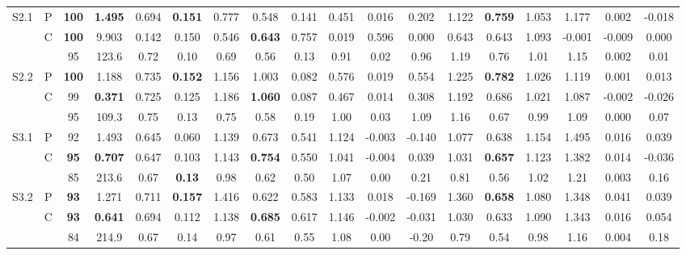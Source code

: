 \begin{table*}[t!]
\begin{adjustbox}{max width=\textwidth}
\begin{tabular}{|c|ccc|cc|cccccc|cccccc|}
\multirow{3}{*}{S2.1} & P & \textbf{100} & \textbf{1.495}  & 0.694 & \textbf{0.151} & 0.777  & 0.548 & 0.141 & 0.451 & 0.016  & 0.202  & 1.122  & \textbf{0.759} & 1.053 & 1.177 & 0.002 & -0.018 \\
 & C & \textbf{100} & 9.903  & 0.142 & 0.150 & 0.546  & \textbf{0.643} & 0.757 & 0.019 & 0.596  & 0.000  & 0.643  & 0.643 & 1.093 & -0.001 & -0.009 & 0.000  \\
 & \cite{smartinezr2023} & 95 & 123.6 & 0.72 & 0.10 & 0.69 & 0.56 & 0.13 & 0.91 & 0.02 & 0.96  & 1.19 & 0.76 & 1.01 & 1.15 & 0.002  & 0.01  \\
\hline 

\multirow{3}{*}{S2.2} & P & \textbf{100} & 1.188  & 0.735 & \textbf{0.152} & 1.156  & 1.003 & 0.082 & 0.576 & 0.019  & 0.554  & 1.225  & \textbf{0.782} & 1.026 & 1.119 & 0.001 & 0.013  \\
 & C & 99  & \textbf{0.371}  & 0.725 & 0.125 & 1.186  & \textbf{1.060} & 0.087 & 0.467 & 0.014  & 0.308  & 1.192  & 0.686 & 1.021 & 1.087  & -0.002 & -0.026 \\
 & \cite{smartinezr2023} &  95 & 109.3 & 0.75 & 0.13 & 0.75 & 0.58 & 0.19 & 1.00 & 0.03 & 1.09  & 1.16 & 0.67 & 0.99 & 1.09 & 0.000  & 0.07  \\
\hline 

\multirow{3}{*}{S3.1} & P & 92  & 1.493  & 0.645 & 0.060 & 1.139  & 0.673 & 0.541 & 1.124 & -0.003 & -0.140 & 1.077  & 0.638 & 1.154 & 1.495 & 0.016 & 0.039  \\
 & C & \textbf{95}  & \textbf{0.707}  & 0.647 & 0.103 & 1.143  & \textbf{0.754} & 0.550 & 1.041 & -0.004 & 0.039  & 1.031  & \textbf{0.657} & 1.123 & 1.382  & 0.014  & -0.036 \\
 & \cite{smartinezr2023} &  85 & 213.6 &  0.67 & \textbf{0.13} & 0.98 & 0.62 & 0.50 & 1.07 & 0.00 & 0.21  & 0.81 & 0.56 & 1.02 & 1.21 & 0.003  & 0.16  \\
\hline 

\multirow{3}{*}{S3.2} & P & \textbf{93}  & 1.271  & 0.711 & \textbf{0.157} & 1.416  & 0.622 & 0.583 & 1.133 & 0.018  & -0.169 & 1.360  & \textbf{0.658} & 1.080 & 1.348 & 0.041 & 0.039  \\
 & C & \textbf{93}  & \textbf{0.641}  & 0.694 & 0.112 & 1.138  & \textbf{0.685} & 0.617 & 1.146 & -0.002 & -0.031 & 1.030  & 0.633 & 1.090 & 1.343  & 0.016  & 0.054  \\
 & \cite{smartinezr2023} & 84 & 214.9  & 0.67 & 0.14 & 0.97 & 0.61 & 0.55 & 1.08 & 0.00 & -0.20 & 0.79 & 0.54 & 0.98 & 1.16 & 0.004  & 0.18  \\
\hline 


\end{tabular}
\end{adjustbox}
\end{table*}

